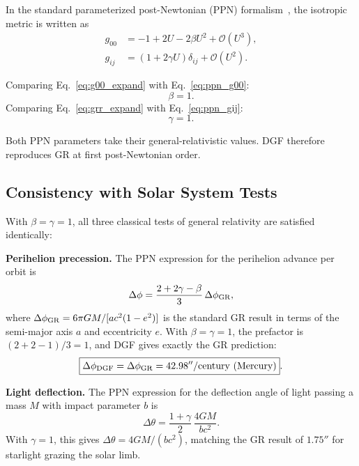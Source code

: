 In the standard parameterized post-Newtonian (PPN) formalism~\cite{Will:1993,Will:2014}, the isotropic metric is written as
\begin{align}
g_{00} &= -1 + 2U - 2\beta U^2 + \mathcal{O}(U^3), \label{eq:ppn_g00} \\
g_{ij} &= (1 + 2\gamma U)\delta_{ij} + \mathcal{O}(U^2). \label{eq:ppn_gij}
\end{align}

Comparing Eq.~\eqref{eq:g00_expand} with Eq.~\eqref{eq:ppn_g00}:
\begin{equation}
\boxed{\beta = 1}.
\label{eq:beta}
\end{equation}
Comparing Eq.~\eqref{eq:grr_expand} with Eq.~\eqref{eq:ppn_gij}:
\begin{equation}
\boxed{\gamma = 1}.
\label{eq:gamma}
\end{equation}

Both PPN parameters take their general-relativistic values.
DGF therefore reproduces GR at first post-Newtonian order.

\subsection{Consistency with Solar System Tests}

With $\beta=\gamma=1$, all three classical tests of general relativity are satisfied identically:

\textbf{Perihelion precession.}
The PPN expression for the perihelion advance per orbit is~\cite{Will:1993}
\begin{equation}
\Delta\phi = \frac{2+2\gamma-\beta}{3}\,\Delta\phi_{\rm GR},
\end{equation}
where $\Delta\phi_{\rm GR}=6\pi GM/[ac^2(1-e^2)]$ is the standard GR result in terms of the semi-major axis $a$ and eccentricity $e$.
With $\beta=\gamma=1$, the prefactor is $(2+2-1)/3=1$, and DGF gives exactly the GR prediction:
\begin{equation}
\boxed{\Delta\phi_{\rm DGF} = \Delta\phi_{\rm GR} = 42.98''\text{/century (Mercury)}}.
\end{equation}

\textbf{Light deflection.}
The PPN expression for the deflection angle of light passing a mass $M$ with impact parameter $b$ is
\begin{equation}
\Delta\theta = \frac{1+\gamma}{2}\,\frac{4GM}{bc^2}.
\end{equation}
With $\gamma=1$, this gives $\Delta\theta = 4GM/(bc^2)$, matching the GR result of $1.75''$ for starlight grazing the solar limb.

